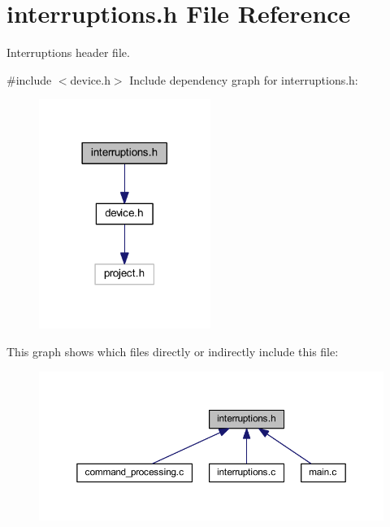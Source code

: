 \section{interruptions.\+h File Reference}
\label{interruptions_8h}


Interruptions header file.  


{\ttfamily \#include $<$device.\+h$>$}\newline
Include dependency graph for interruptions.\+h\+:
\nopagebreak
\begin{figure}[H]
\begin{center}
\leavevmode
\includegraphics[width=158pt]{interruptions_8h__incl}
\end{center}
\end{figure}
This graph shows which files directly or indirectly include this file\+:
\nopagebreak
\begin{figure}[H]
\begin{center}
\leavevmode
\includegraphics[width=350pt]{interruptions_8h__dep__incl}
\end{center}
\end{figure}
